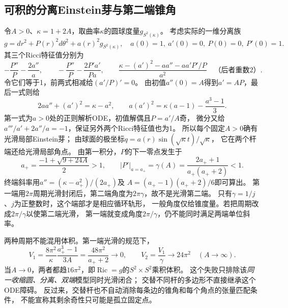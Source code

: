 \documentclass[UTF8,a4paper,11pt,fontset=fandol]{ctexart}
\numberwithin{equation}{section}
\theoremstyle{definition}
\newcommand{\Ric}{\operatorname{Ric}}
\begin{document}
\subsection{可积的分离Einstein芽与第二端锥角}
令$A>0$、$\kappa=1+2A$，取曲率$\kappa$的圆球度量$g_{S^2(\kappa)}$。
考虑实际的一维分离族
\begin{equation}\label{eq:toric-separated-metric}
 g=dr^2+P(r)^2d\theta^2+a(r)^2g_{S^2(\kappa)},\quad
 a(0)=1,\ a'(0)=0,\ P(0)=0,\ P'(0)=1.
\end{equation}
其三个Ricci特征值分别为
\begin{equation}\label{eq:toric-separated-Ricci}
 -\frac{P''}{P}-\frac{2a''}{a},\qquad
 -\frac{P''}{P}-\frac{2P'a'}{Pa},\qquad
 \frac{\kappa-(a')^2-aa''-aa'P'/P}{a^2}\quad\text{（后者重数2）}.
\end{equation}
令它们等于1，前两式相减给$(a'/P)'=0$。
由初值$a''(0)=A$得到$a'=AP$，最后一式则给
\begin{equation}\label{eq:toric-separated-first}
 2aa''+(a')^2=\kappa-a^2,\qquad
 a(a')^2=\kappa(a-1)-\frac{a^3-1}{3}.
\end{equation}
第一式为$a>0$处的正则解析ODE，初值解偶且$P=a'/A$奇，
微分又给$a'''/a'+2a''/a=-1$，保证另外两个Ricci特征值也为1。
所以每个固定$A>0$确有光滑局部Einstein芽；
由球面的极坐标$q=a(r)\sin(\sqrt\kappa t)/\sqrt\kappa$，
它在两个杆端还给光滑局部角点。
由第一积分，$P$的下一零点发生于
\begin{equation}\label{eq:toric-separated-angle}
 a_+=\frac{-1+\sqrt{9+24A}}2>1,\qquad
 |P'|_{a=a_+}=\gamma(A)=\frac{2a_++1}{a_+(a_++2)}<1.
\end{equation}
终端斜率用$a''=(\kappa-a_+^2)/(2a_+)$及
$A=(a_+-1)(a_++2)/6$即可算出。
第一端用$2\pi$周期光滑封闭后，第二端角度为$2\pi\gamma$，故不是光滑第二端。
只有$\gamma=1/j$、$j$为正整数时，这个端部才是相应循环轨形，
一般角度仅给锥度量。若把周期改成$2\pi/\gamma$以使第二端光滑，
第一端就变成角度$2\pi/\gamma$，仍不能同时满足两端单位斜率。

两种周期不能混用体积。第一端光滑的规范下，
\begin{equation}\label{eq:toric-separated-volume}
 V_1=\frac{8\pi^2}{\kappa}\frac{a_+^3-1}{3A}
     =\frac{48\pi^2}{a_++2}\longrightarrow0,\qquad
 V_2=\frac{V_1}{\gamma}\longrightarrow24\pi^2
 \quad(A\to\infty).
\end{equation}
当$A\to0$，两者都趋$16\pi^2$，即$\Ric=g$的$S^2\times S^2$乘积体积。
这个失败只排除该\emph{同一收缩圆、分离、双端}模型同时光滑闭合；
交替不同杆的多边形不直接继承这个ODE障碍。
反过来，交替杆也不自动消除每条边的锥角和每个角点的张量匹配条件，
不能宣称其剩余奇性只可能是孤立固定点。
\end{document}
